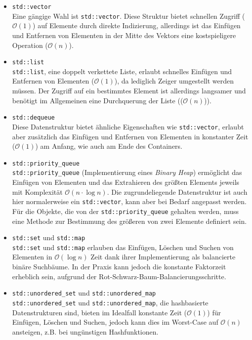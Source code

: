 \begin{itemize}
    \item \texttt{std::vector}\\
    Eine gängige Wahl ist \texttt{std::vector}.
    Diese Struktur bietet schnellen Zugriff ($\mathcal{O}(1)$) auf Elemente durch direkte Indizierung, allerdings ist
    das Einfügen und Entfernen von Elementen in der Mitte des Vektors eine kostspieligere Operation ($\mathcal{O}(n)$).
    \item \texttt{std::list}\\
    \texttt{std::list}, eine doppelt verkettete Liste, erlaubt schnelles Einfügen und Entfernen von Elementen ($\mathcal{O}(1)$),
    da lediglich Zeiger umgestellt werden müssen.
    Der Zugriff auf ein bestimmtes Element ist allerdings langsamer und benötigt im Allgemeinen eine Durchquerung der Liste (($\mathcal{O}(n)$)).
    \item \texttt{std::dequeue}\\
    Diese Datenstruktur bietet ähnliche Eigenschaften wie \texttt{std::vector}, erlaubt aber zusätzlich das Einfügen
    und Entfernen von Elementen in konstanter Zeit ($\mathcal{O}(1)$) am Anfang, wie auch am Ende des Containers.
    \item \texttt{std::priority\_queue}\\
    \texttt{std::priority\_queue} (Implementierung eines \textit{Binary Heap}) ermöglicht das Einfügen von Elementen und das Extrahieren des größten Elements jeweils
    mit Komplexität $\mathcal{O}(n\cdot\log n)$.
    Die zugrundeliegende Datenstruktur ist auch hier normalerweise ein \texttt{std::vector}, kann aber bei Bedarf angepasst werden.
    Für die Objekte, die von der \texttt{std::priority\_queue} gehalten werden, muss eine Methode zur Bestimmung des
    größeren von zwei Elemente definiert sein.
    \item \texttt{std::set} und \texttt{std::map}\\
    \texttt{std::set} und \texttt{std::map} erlauben das Einfügen, Löschen und Suchen von Elementen in $\mathcal{O}(\log n)$ Zeit
    dank ihrer Implementierung als balancierte binäre Suchbäume.
    In der Praxis kann jedoch die konstante Faktorzeit erheblich sein, aufgrund der Rot-Schwarz-Baum-Balancierungsschritte.
    \item \texttt{std::unordered\_set} und \texttt{std::unordered\_map}\\
    \texttt{std::unordered\_set} und \texttt{std::unordered\_map}, die hashbasierte Datenstrukturen sind, bieten im
    Idealfall konstante Zeit ($\mathcal{O}(1)$) für Einfügen, Löschen und Suchen, jedoch kann dies im Worst-Case auf $\mathcal{O}(n)$
    ansteigen, z.B. bei ungünstigen Hashfunktionen.
\end{itemize}
